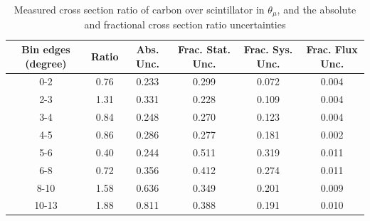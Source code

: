 \documentclass[../main.tex]{subfiles}
\begin{document}
\begin{table}
  \centering
  \renewcommand{\arraystretch}{1.15}
  \caption{Systematic covariance matrix of measured cross section ratio of carbon over scintillator in $p_{\mu}$}
  \label{tbl:rationucleonnuc6muon_pc}
\end{table}
\begin{table}
  \centering
  \renewcommand{\arraystretch}{1.15}
  \caption{Measured cross section ratio of carbon over scintillator in $\theta_{\mu}$, and the absolute and fractional cross section ratio uncertainties}
    \begin{tabular}{c||c|c||c|c|c}
      Bin edges (degree) &  Ratio  &  Abs. Unc.  &  Frac. Stat. Unc.  &  Frac. Sys. Unc.  &  Frac. Flux Unc. \\
      \hline
      \hline
      0-2 & 0.76 & 0.233 & 0.299 & 0.072 & 0.004\\
      2-3 & 1.31 & 0.331 & 0.228 & 0.109 & 0.004\\
      3-4 & 0.84 & 0.248 & 0.270 & 0.123 & 0.004\\
      4-5 & 0.86 & 0.286 & 0.277 & 0.181 & 0.002\\
      5-6 & 0.40 & 0.244 & 0.511 & 0.319 & 0.011\\
      6-8 & 0.72 & 0.356 & 0.412 & 0.274 & 0.011\\
      8-10 & 1.58 & 0.636 & 0.349 & 0.201 & 0.009\\
      10-13 & 1.88 & 0.811 & 0.388 & 0.191 & 0.010
    \end{tabular}
  \label{tbl:rationucleonnuc6muon_thetaa}
\end{table}
\end{document}
